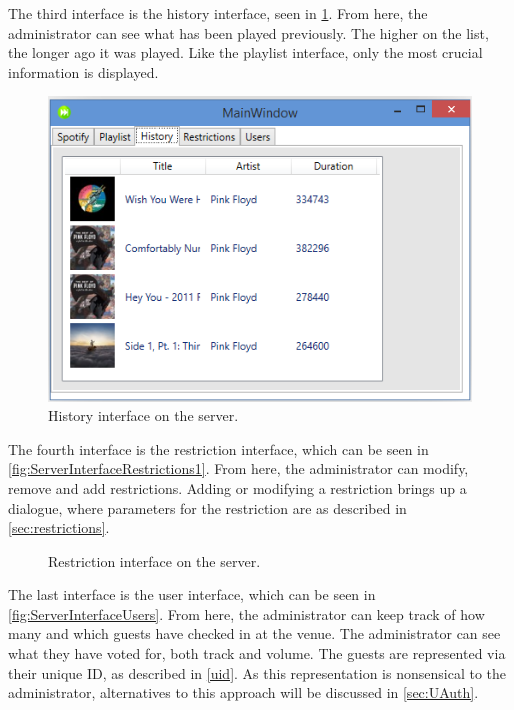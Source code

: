 The third interface is the history interface, seen in \cref{fig:ServerInterfaceHistory}. From here, the administrator can see what has been played previously. The higher on the list, the longer ago it was played. Like the playlist interface, only the most crucial information is displayed. 

\begin{figure}[hbtp]
  \centering
  \includegraphics[width=\textwidth]{Images/ServerInterfaceHistory.png}
  \caption{History interface on the server.}\label{fig:ServerInterfaceHistory}
\end{figure}

The fourth interface is the restriction interface, which can be seen in \cref{fig:ServerInterfaceRestrictions1}. From here, the administrator can modify, remove and add restrictions. Adding or modifying a restriction brings up a dialogue, where parameters for the restriction are as described in \cref{sec:restrictions}.

\begin{figure}[H]
  \centering
  \caption{Restriction interface on the server.}
\end{figure}

The last interface is the user interface, which can be seen in \cref{fig:ServerInterfaceUsers}. From here, the administrator can keep track of how many and which guests have checked in at the venue. The administrator can see what they have voted for, both track and volume. The guests are represented via their unique ID, as described in \cref{uid}. As this representation is nonsensical to the administrator, alternatives to this approach will be discussed in \cref{sec:UAuth}.


